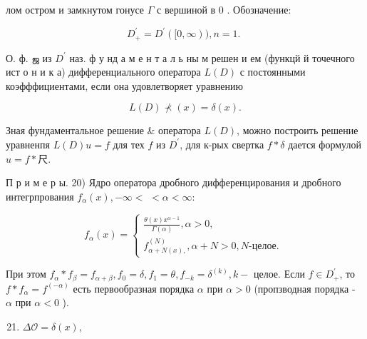 \documentclass[10pt]{article}
\begin{document}
лом остром и замкнутом гонусе $\Gamma$ с вершиной в 0 . Обозначение:



\[

D_{+}^{\prime}=D^{\prime}([0, \infty)), n=1 \text {. }

\]



О. ф. ஜ из $D^{\prime}$ наз. ф у нд а м е н т а л ь ны м решен и ем (функцй й точечного ист о н и к а) дифференциального оператора $L(D)$ с постоянными коэфффициентами, если она удовлетворяет уравнению



\[

L(D) \nprec(x)=\delta(x) .

\]



Зная фундаментальное решение \& оператора $L(D)$, можно построить решение уравненпя $L(D) u=f$ для тех $f$ из $D^{\prime}$, для к-рых свертка $f * \delta$ дается формулой $u=f * 尺$.



П р и м е р ы. 20) Ядро оператора дробного дифференцирования и дробного интегрпрования $f_{\alpha}(x),-\infty<$ $<\alpha<\infty:$



\[

f_{\alpha}(x)=\left\{\begin{array}{l}

\frac{\theta(x) x^{\alpha-1}}{\Gamma(\alpha)}, \alpha>0, \\

f_{\alpha+N(x),}^{(N)}, \alpha+N>0, N \text {-целое. }

\end{array}\right.

\]



При этом $f_{\alpha} * f_{\beta}=f_{\alpha+\beta}, f_{0}=\delta, f_{1}=\theta, f_{-k}=\delta^{(k)}, k-$ целое. Если $f \in D_{+}^{\prime}$, то $f * f_{\alpha}=f^{(-\alpha)}$ есть первообразная порядка $\alpha$ при $\alpha>0$ (пропзводная порядка - $\alpha$ при $\alpha<0$ ).



\begin{enumerate}

  \setcounter{enumi}{20}

  \item $\Delta \mathscr{O}=\delta(x)$,

\end{enumerate}
\end{document}

